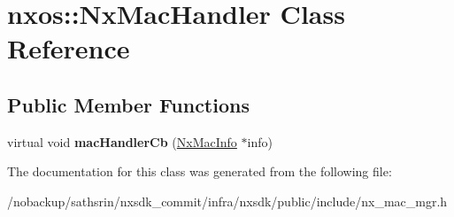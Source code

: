 \hypertarget{classnxos_1_1NxMacHandler}{\section{nxos\-:\-:Nx\-Mac\-Handler Class Reference}
\label{classnxos_1_1NxMacHandler}
}
\subsection*{Public Member Functions}
\begin{DoxyCompactItemize}
\item 
\hypertarget{classnxos_1_1NxMacHandler_a1417a945f8247c9b6d64672a6995196b}{virtual void {\bfseries mac\-Handler\-Cb} (\hyperlink{classnxos_1_1NxMacInfo}{Nx\-Mac\-Info} $\ast$info)}\label{classnxos_1_1NxMacHandler_a1417a945f8247c9b6d64672a6995196b}

\end{DoxyCompactItemize}


The documentation for this class was generated from the following file\-:\begin{DoxyCompactItemize}
\item 
/nobackup/sathsrin/nxsdk\-\_\-commit/infra/nxsdk/public/include/nx\-\_\-mac\-\_\-mgr.\-h\end{DoxyCompactItemize}

